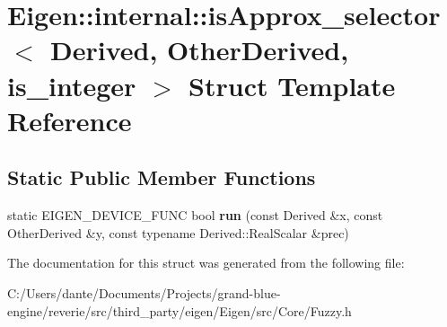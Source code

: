 \hypertarget{struct_eigen_1_1internal_1_1is_approx__selector}{}\section{Eigen\+::internal\+::is\+Approx\+\_\+selector$<$ Derived, Other\+Derived, is\+\_\+integer $>$ Struct Template Reference}
\label{struct_eigen_1_1internal_1_1is_approx__selector}
\subsection*{Static Public Member Functions}
\begin{DoxyCompactItemize}
\item 
\mbox{\label{struct_eigen_1_1internal_1_1is_approx__selector_a93f494392154017563565bb80c10a6fb}} 
static E\+I\+G\+E\+N\+\_\+\+D\+E\+V\+I\+C\+E\+\_\+\+F\+U\+NC bool {\bfseries run} (const Derived \&x, const Other\+Derived \&y, const typename Derived\+::\+Real\+Scalar \&prec)
\end{DoxyCompactItemize}


The documentation for this struct was generated from the following file\+:\begin{DoxyCompactItemize}
\item 
C\+:/\+Users/dante/\+Documents/\+Projects/grand-\/blue-\/engine/reverie/src/third\+\_\+party/eigen/\+Eigen/src/\+Core/Fuzzy.\+h\end{DoxyCompactItemize}
